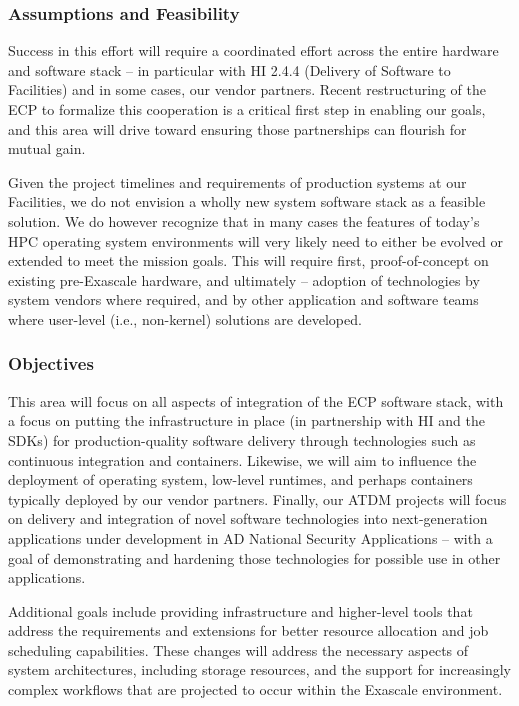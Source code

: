 \subsubsection{Assumptions and Feasibility}
Success in this effort will require a coordinated effort across the entire hardware and software stack – in particular with HI 2.4.4 (Delivery of Software to Facilities) and in some cases, our vendor partners. Recent restructuring of the ECP to formalize this cooperation is a critical first step in enabling our goals, and this area will drive toward ensuring those partnerships can flourish for mutual gain.

Given the project timelines and requirements of production systems at our Facilities, we do not envision a wholly new system software stack as a feasible solution. We do however recognize that in many cases the features of today's HPC operating system environments will very likely need to either be evolved or extended to meet the mission goals. This will require first, proof-of-concept on existing pre-Exascale hardware, and ultimately – adoption of technologies by system vendors where required, and by other application and software teams where user-level (i.e., non-kernel) solutions are developed. 

\subsubsection{Objectives}
This area will focus on all aspects of integration of the ECP software stack, with a focus on putting the infrastructure in place (in partnership with HI and the SDKs) for production-quality software delivery through technologies such as continuous integration and containers. Likewise, we will aim to influence the deployment of operating system, low-level runtimes, and perhaps containers typically deployed by our vendor partners. Finally, our ATDM projects will focus on delivery and integration of novel software technologies into next-generation applications under development in AD National Security Applications – with a goal of demonstrating and hardening those technologies for possible use in other applications.

Additional goals include providing infrastructure and higher-level tools that address the requirements and extensions for better resource allocation and job scheduling capabilities. These changes will address the necessary aspects of system architectures, including storage resources, and the support for increasingly complex workflows that are projected to occur within the Exascale environment. 

